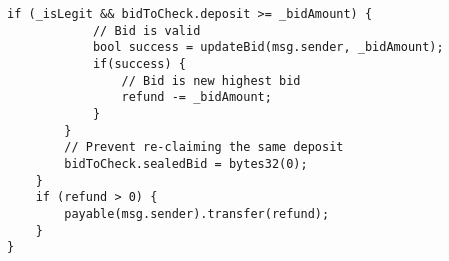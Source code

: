 \begin{lstlisting}[language=Solidity]
		if (_isLegit && bidToCheck.deposit >= _bidAmount) {
			// Bid is valid
			bool success = updateBid(msg.sender, _bidAmount);
			if(success) {
				// Bid is new highest bid
				refund -= _bidAmount;
			}
		}
		// Prevent re-claiming the same deposit
		bidToCheck.sealedBid = bytes32(0);
	}
	if (refund > 0) {
		payable(msg.sender).transfer(refund);
	}
}
\end{lstlisting}